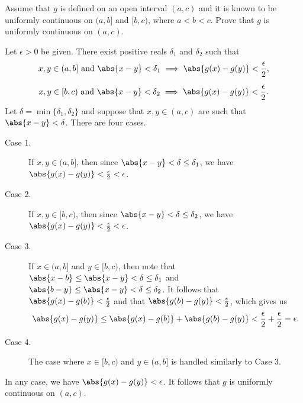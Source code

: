 \documentclass{lew98_solutions}
\begin{document}
\begin{exercise}
\label{ex:4.4.5}
    Assume that \( g \) is defined on an open interval \( (a, c) \) and it is known to be uniformly continuous on \( (a, b] \) and \( [b, c) \), where \( a < b < c \). Prove that \( g \) is uniformly continuous on \( (a, c) \).
\end{exercise}

\begin{solution}
    Let \( \epsilon > 0 \) be given. There exist positive reals \( \delta_1 \) and \( \delta_2 \) such that
    \begin{gather*}
        x, y \in (a, b] \text{ and } \abs{x - y} < \delta_1 \implies \abs{g(x) - g(y)} < \frac{\epsilon}{2}, \\[2mm]
        x, y \in [b, c) \text{ and } \abs{x - y} < \delta_2 \implies \abs{g(x) - g(y)} < \frac{\epsilon}{2}.
    \end{gather*}
    Let \( \delta = \min \{ \delta_1, \delta_2 \} \) and suppose that \( x, y \in (a, c) \) are such that \( \abs{x - y} < \delta \). There are four cases.
    \begin{description}
        \item[Case 1.] If \( x, y \in (a, b] \), then since \( \abs{x - y} < \delta \leq \delta_1 \), we have \( \abs{g(x) - g(y)} < \tfrac{\epsilon}{2} < \epsilon \).
        
        \item[Case 2.] If \( x, y \in [b, c) \), then since \( \abs{x - y} < \delta \leq \delta_2 \), we have \( \abs{g(x) - g(y)} < \tfrac{\epsilon}{2} < \epsilon \).

        \item[Case 3.] If \( x \in (a, b] \) and \( y \in [b, c) \), then note that \( \abs{x - b} \leq \abs{x - y} < \delta \leq \delta_1 \) and \( \abs{b - y} \leq \abs{x - y} < \delta \leq \delta_2 \). It follows that \( \abs{g(x) - g(b)} < \tfrac{\epsilon}{2} \) and that \( \abs{g(b) - g(y)} < \tfrac{\epsilon}{2} \), which gives us
        \[
            \abs{g(x) - g(y)} \leq \abs{g(x) - g(b)} + \abs{g(b) - g(y)} < \frac{\epsilon}{2} + \frac{\epsilon}{2} = \epsilon.
        \]

        \item[Case 4.] The case where \( x \in [b, c) \) and \( y \in (a, b] \) is handled similarly to Case 3.
    \end{description}
    In any case, we have \( \abs{g(x) - g(y)} < \epsilon \). It follows that \( g \) is uniformly continuous on \( (a, c) \).
\end{solution}
\end{document}
